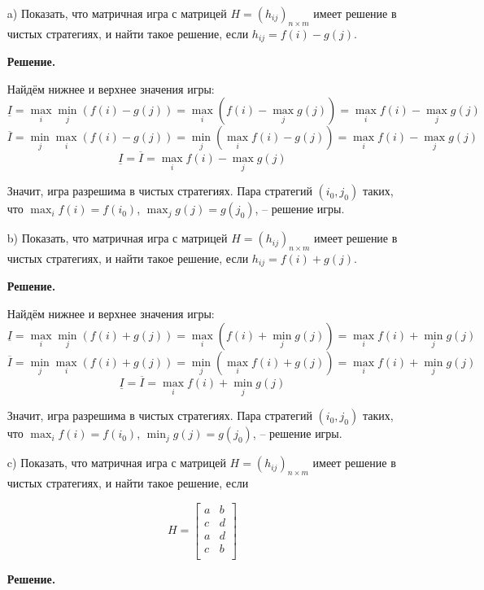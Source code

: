 \documentclass[a4paper,14pt]{extreport}
\begin{document}
\begin{itemize}

\item[a)] Показать, что матричная игра с матрицей $H=(h_{ij})_{n \times m}$  имеет решение в чистых стратегиях, и найти такое решение, если $h_{ij} = f(i) - g(j)$.

\textbf{Решение.} 

Найдём нижнее и верхнее значения игры:
$$
\underline{I} = \max_i \min_j \left( f(i) - g(j) \right) = \max_i \left( f(i) - \max_j g(j) \right) = \max_i f(i) - \max_j g(j)
$$ $$
\overline{I} = \min_j \max_i \left( f(i) - g(j) \right) = \min_j \left( \max_i f(i) - g(j) \right) = \max_i f(i) - \max_j g(j)
$$ $$
\underline{I} = \overline{I} = \max_i f(i) - \max_j g(j)
$$

Значит, игра разрешима в чистых стратегиях.
Пара стратегий $(i_0, j_0)$ таких, что $\max_i f(i) = f(i_0)$, $\max_j g(j) = g(j_0)$, -- решение игры.
\newline

\item[b)] Показать, что матричная игра с матрицей $H=(h_{ij})_{n \times m}$  имеет решение в чистых стратегиях, и найти такое решение, если $h_{ij} = f(i) + g(j)$.

\textbf{Решение.} 

Найдём нижнее и верхнее значения игры:
$$
\underline{I} = \max_i \min_j \left( f(i) + g(j) \right) = \max_i \left( f(i) + \min_j g(j) \right) = \max_i f(i) + \min_j g(j)
$$ $$
\overline{I} = \min_j \max_i \left( f(i) + g(j) \right) = \min_j \left( \max_i f(i) + g(j) \right) = \max_i f(i) + \min_j g(j)
$$ $$
\underline{I} = \overline{I} = \max_i f(i) + \min_j g(j)
$$

Значит, игра разрешима в чистых стратегиях.
Пара стратегий $(i_0, j_0)$ таких, что $\max_i f(i) = f(i_0)$, $\min_j g(j) = g(j_0)$, -- решение игры.
\newline

\item[c)] Показать, что матричная игра с матрицей $H=(h_{ij})_{n \times m}$  имеет решение в чистых стратегиях, и найти такое решение, если

\[
H = \begin{bmatrix}
	a & b\\
	c & d\\
	a & d\\
	c & b\\
\end{bmatrix}
\]

\textbf{Решение.} 


\end{itemize}
\end{document}
